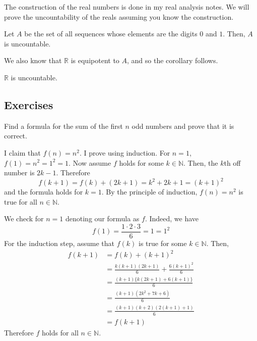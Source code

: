 \documentclass{article}
\begin{document}
    The construction of the real numbers is done in my real analysis notes. We will prove the uncountability of the reals assuming you know the construction. 

    \begin{theorem}
      Let $A$ be the set of all sequences whose elements are the digits $0$ and $1$. Then, $A$ is uncountable. 
    \end{theorem}

    We also know that $\mathbb{R}$ is equipotent to $A$, and so the corollary follows. 

    \begin{corollary}
      $\mathbb{R}$ is uncountable. 
    \end{corollary}

  \subsection{Exercises} 

    \begin{exercise}
      Find a formula for the sum of the first $n$ odd numbers and prove that it is correct.
    \end{exercise}
    \begin{solution}
      I claim that $f(n) = n^2$. I prove using induction. For $n = 1$, $f(1) = n^2 = 1^2 = 1$. Now assume $f$ holds for some $k \in \mathbb{N}$. Then, the $k$th off number is $2k-1$. Therefore 
      \begin{equation}
        f(k+1) = f(k) + (2k + 1) = k^2 + 2k + 1 = (k + 1)^2
      \end{equation}
      and the formula holds for $k=1$. By the principle of induction, $f(n) = n^2$ is true for all $n \in \mathbb{N}$. 
    \end{solution}

    \begin{exercise}
      We check for $n = 1$ denoting our formula as $f$. Indeed, we have 
      \begin{equation}
        f(1) = \frac{1 \cdot 2 \cdot 3}{6} = 1 = 1^2
      \end{equation} 
      For the induction step, assume that $f(k)$ is true for some $k \in \mathbb{N}$. Then, 
      \begin{align}
        f(k+1) & = f(k) + (k+1)^2 \\
               & = \frac{k (k + 1) (2k + 1)}{6} + \frac{6 (k+1)^2}{6} \\
               & = \frac{(k+1) \{ k (2k+1) + 6(k+1)\}}{6} \\
               & = \frac{(k+1) (2k^2 + 7k + 6)}{6} \\
               & = \frac{(k+1)(k+2)(2(k+1) + 1)}{6} \\
               & = f(k+1)
      \end{align}
      Therefore $f$ holds for all $n \in \mathbb{N}$. 
    \end{exercise} 
\end{document}
